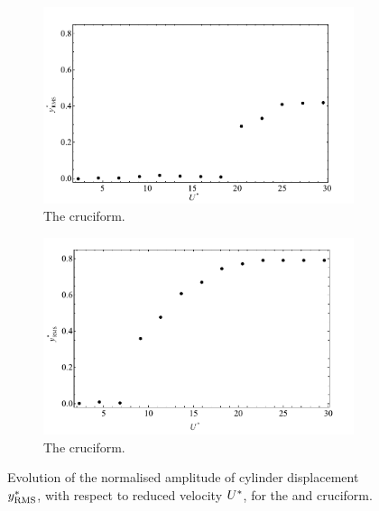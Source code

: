 \documentclass[oneside]{utmthesis}
\begin{document}
\begin{figure}
  \centering
  \begin{subfigure}[h]{1\textwidth}
    \includegraphics[width=\textwidth]{figs/yStrRMS4}
  \caption{The \angtw{} cruciform.}
    \label{fig:yStrRMS4}
  \end{subfigure}
  
  \begin{subfigure}[h]{1\textwidth}
    \includegraphics[width=\textwidth]{figs/yStrRMS5}
    \caption{The \angon{} cruciform.}
    \label{fig:yStrRMS5}
  \end{subfigure}

  \caption{Evolution of the normalised \rms{} amplitude of cylinder displacement $y^{*}_{\text{RMS}}$, with respect to reduced velocity $U^{*}$, for the \angtw{} and \angon{} cruciform.}
  \label{fig:yStrRMS45}
\end{figure}
\end{document}
